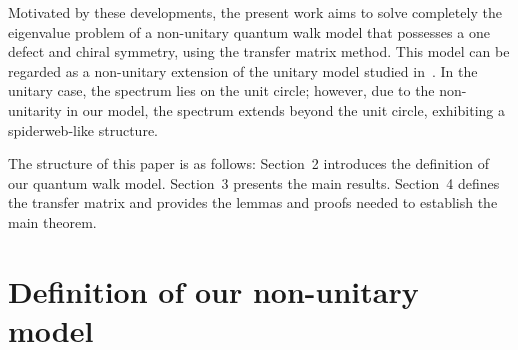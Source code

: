 \documentclass[a4paper,12pt]{article}
\theoremstyle{plain}
\theoremstyle{definition}
\theoremstyle{definition}
\begin{document}
Motivated by these developments, the present work aims to solve completely the eigenvalue problem of a non-unitary quantum walk model that possesses a one defect and chiral symmetry, using the transfer matrix method.  
This model can be regarded as a non-unitary extension of the unitary model studied in~\cite{EndoKonno2014,Antoni2012}.  
In the unitary case, the spectrum lies on the unit circle; however, due to the non-unitarity in our model, the spectrum extends beyond the unit circle, exhibiting a spiderweb-like structure.

The structure of this paper is as follows:  
Section~2 introduces the definition of our quantum walk model.  
Section~3 presents the main results.  
Section~4 defines the transfer matrix and provides the lemmas and proofs needed to establish the main theorem.











\section{Definition of our non-unitary model}
\end{document}
